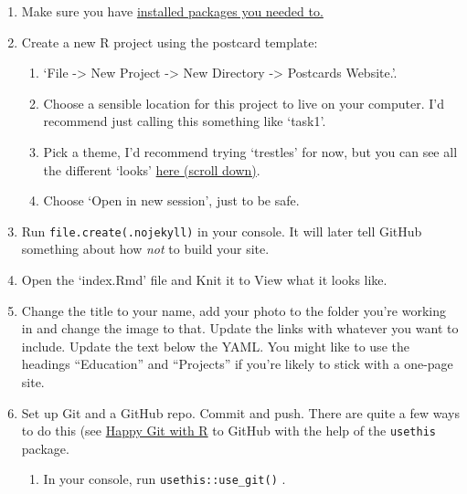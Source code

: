 \documentclass[
]{article}
\providecommand{\tightlist}{%
  \setlength{\itemsep}{0pt}\setlength{\parskip}{0pt}}
\begin{document}
\begin{enumerate}
\def\labelenumi{\arabic{enumi}.}
\item
  Make sure you have \protect\hyperlink{s1pre}{installed packages you needed to.}
\item
  Create a new R project using the postcard template:

  \begin{enumerate}
  \def\labelenumii{\alph{enumii}.}
  \tightlist
  \item
    `File -\textgreater{} New Project -\textgreater{} New Directory -\textgreater{} Postcards Website.'.
  \item
    Choose a sensible location for this project to live on your computer. I'd recommend just calling this something like `task1'.
  \item
    Pick a theme, I'd recommend trying `trestles' for now, but you can see all the different `looks' \href{https://github.com/seankross/postcards}{here (scroll down)}.
  \item
    Choose `Open in new session', just to be safe.
  \end{enumerate}
\item
  Run \texttt{file.create(\textquotesingle{}.nojekyll\textquotesingle{})} in your console. It will later tell GitHub something about how \emph{not} to build your site.
\item
  Open the `index.Rmd' file and Knit it to View what it looks like.
\item
  Change the title to your name, add your photo to the folder you're working in and change the image to that. Update the links with whatever you want to include. Update the text below the YAML. You might like to use the headings ``Education'' and ``Projects'' if you're likely to stick with a one-page site.
\item
  Set up Git and a GitHub repo. Commit and push. There are quite a few ways to do this (see \href{https://happygitwithr.com/existing-github-last.html}{Happy Git with R} to GitHub with the help of the \texttt{usethis} package.

  \begin{enumerate}
  \def\labelenumii{\alph{enumii}.}
  \item
    In your console, run \texttt{usethis::use\_git()} .


\end{enumerate}
\end{enumerate}
\end{document}
